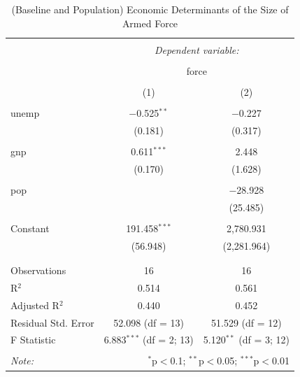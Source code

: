 \documentclass[11pt,]{article}
\begin{document}
\begin{table}[!htbp] \centering 
  \caption{(Baseline and Population) Economic Determinants of the Size of Armed Force} 
  \label{tab:arm2} 
\begin{tabular}{@{\extracolsep{5pt}}lcc} 
\\[-1.8ex]\hline 
\hline \\[-1.8ex] 
 & \multicolumn{2}{c}{\textit{Dependent variable:}} \\ 
\cline{2-3} 
\\[-1.8ex] & \multicolumn{2}{c}{force} \\ 
\\[-1.8ex] & (1) & (2)\\ 
\hline \\[-1.8ex] 
 unemp & $-$0.525$^{**}$ & $-$0.227 \\ 
  & (0.181) & (0.317) \\ 
  & & \\ 
 gnp & 0.611$^{***}$ & 2.448 \\ 
  & (0.170) & (1.628) \\ 
  & & \\ 
 pop &  & $-$28.928 \\ 
  &  & (25.485) \\ 
  & & \\ 
 Constant & 191.458$^{***}$ & 2,780.931 \\ 
  & (56.948) & (2,281.964) \\ 
  & & \\ 
\hline \\[-1.8ex] 
Observations & 16 & 16 \\ 
R$^{2}$ & 0.514 & 0.561 \\ 
Adjusted R$^{2}$ & 0.440 & 0.452 \\ 
Residual Std. Error & 52.098 (df = 13) & 51.529 (df = 12) \\ 
F Statistic & 6.883$^{***}$ (df = 2; 13) & 5.120$^{**}$ (df = 3; 12) \\ 
\hline 
\hline \\[-1.8ex] 
\textit{Note:}  & \multicolumn{2}{r}{$^{*}$p$<$0.1; $^{**}$p$<$0.05; $^{***}$p$<$0.01} \\ 
\end{tabular} 
\end{table}
\end{document}
